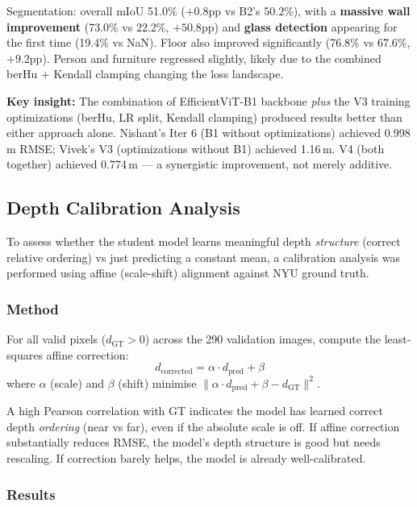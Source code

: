 \documentclass[11pt,a4paper]{article}
\begin{document}
Segmentation: overall mIoU 51.0\% ($+0.8$pp vs B2's 50.2\%), with a
\textbf{massive wall improvement} (73.0\% vs 22.2\%, $+50.8$pp) and
\textbf{glass detection} appearing for the first time (19.4\% vs NaN).
Floor also improved significantly (76.8\% vs 67.6\%, $+9.2$pp). Person
and furniture regressed slightly, likely due to the combined
berHu + Kendall clamping changing the loss landscape.

\textbf{Key insight:} The combination of EfficientViT-B1 backbone \emph{plus}
the V3 training optimizations (berHu, LR split, Kendall clamping) produced
results better than either approach alone. Nishant's Iter 6 (B1 without
optimizations) achieved 0.998\,m RMSE; Vivek's V3 (optimizations without B1)
achieved 1.16\,m. V4 (both together) achieved 0.774\,m --- a synergistic
improvement, not merely additive.

\subsection{Depth Calibration Analysis}
\label{sec:vivek-calibration}

To assess whether the student model learns meaningful depth \emph{structure}
(correct relative ordering) vs just predicting a constant mean, a calibration
analysis was performed using affine (scale-shift) alignment against NYU
ground truth.

\subsubsection{Method}

For all valid pixels ($d_{\text{GT}} > 0$) across the 290 validation images,
compute the least-squares affine correction:
\[
  d_{\text{corrected}} = \alpha \cdot d_{\text{pred}} + \beta
\]
where $\alpha$ (scale) and $\beta$ (shift) minimise
$\| \alpha \cdot d_{\text{pred}} + \beta - d_{\text{GT}} \|^2$.

A high Pearson correlation with GT indicates the model has learned correct
depth \emph{ordering} (near vs far), even if the absolute scale is off.
If affine correction substantially reduces RMSE, the model's depth structure
is good but needs rescaling. If correction barely helps, the model is already
well-calibrated.

\subsubsection{Results}
\end{document}
